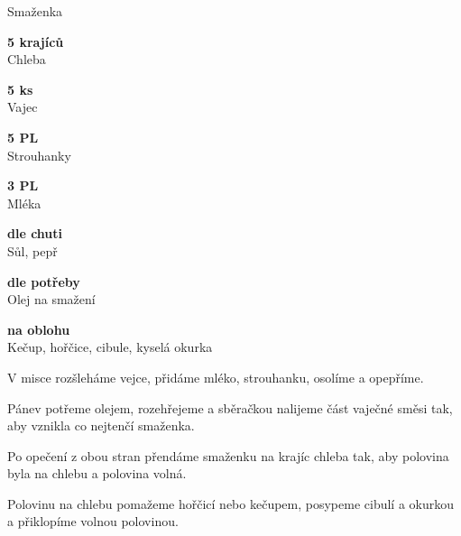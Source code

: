 \documentclass[11pt,a4paper]{article}
\begin{document}
\begin{recipe}[Moccasin]{Smaženka}
    \begin{ingredients}
        \item \parbox[t]{\linewidth}{\raggedright \piece \textbf{5 krajíců}\\ Chleba}
        \item \parbox[t]{\linewidth}{\raggedright \piece \textbf{5 ks}\\ Vajec}
        \item \parbox[t]{\linewidth}{\raggedright \spoon \textbf{5 PL}\\ Strouhanky}
        \item \parbox[t]{\linewidth}{\raggedright \spoon \textbf{3 PL}\\ Mléka}
        \item \parbox[t]{\linewidth}{\raggedright \indefinite \textbf{dle chuti}\\ Sůl, pepř}
        \item \parbox[t]{\linewidth}{\raggedright \liquid \textbf{dle potřeby}\\ Olej na smažení}
        \item \parbox[t]{\linewidth}{\raggedright \indefinite \textbf{na oblohu}\\ Kečup, hořčice, cibule, kyselá okurka}
    \end{ingredients}
    \begin{steps}
        \item V misce rozšleháme vejce, přidáme mléko, strouhanku, osolíme a opepříme.
        \item Pánev potřeme olejem, rozehřejeme a sběračkou nalijeme část vaječné směsi tak, aby vznikla co nejtenčí smaženka.
        \item Po opečení z obou stran přendáme smaženku na krajíc chleba tak, aby polovina byla na chlebu a polovina volná.
        \item Polovinu na chlebu pomažeme hořčicí nebo kečupem, posypeme cibulí a okurkou a přiklopíme volnou polovinou.
    \end{steps}
\end{recipe}
\end{document}
